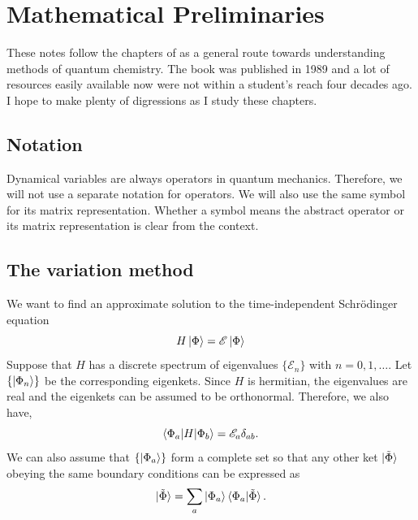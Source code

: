 \chapter{Mathematical Preliminaries}\label{c1}
These notes follow the chapters of \cite{so1989} as a general route towards 
understanding methods of quantum chemistry. The book was published in 1989 and
a lot of resources easily available now were not within a student's reach four
decades ago. I hope to make plenty of digressions as I study these chapters.

\section{Notation}
Dynamical variables are always operators in quantum mechanics. Therefore, we will
not use a separate notation for operators. We will also use the same symbol for
its matrix representation. Whether a symbol means the abstract operator or its
matrix representation is clear from the context.

\section{The variation method}
We want to find an approximate solution to the time-independent Schr\"{o}dinger
equation
\begin{equation}\label{c1e1}
H\ket{\Phi} = \mathscr{E}\ket{\Phi}
\end{equation}
Suppose that $H$ has a discrete spectrum of eigenvalues $\{\mathscr{E}_n\}$
with $n = 0, 1, \ldots$. Let $\{\ket{\Phi_n}\}$ be the corresponding eigenkets.
Since $H$ is hermitian, the eigenvalues are real and the eigenkets can be
assumed to be orthonormal. Therefore, we also have,
\begin{equation}\label{c1e2}
\braket{\Phi_a|H|\Phi_b} = \mathscr{E}_a\delta_{ab}.
\end{equation}
We can also assume that $\{\ket{\Phi_a}\}$ form a complete set so that any other
ket $\ket{\tilde{\Phi}}$ obeying the same boundary conditions can be expressed
as 
\begin{equation}\label{c1e3}
\ket{\tilde{\Phi}} = \sum_a\ket{\Phi_a}\braket{\Phi_a|\tilde{\Phi}}.
\end{equation}

